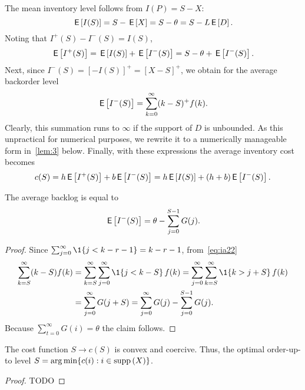 \documentclass[stochastic-or.tex]{subfiles}
\begin{document}
The mean inventory level follows from $I(P) = S - X$:
\begin{equation*}
\,\mathsf{E}\left[I(S)\right] = S - \,\mathsf{E}\left[X\right] = S - \theta = S - L\,\mathsf{E}\left[D\right].
\end{equation*}
Noting that $I^+(S) - I^-(S) = I(S)$,
\begin{equation*}
\,\mathsf{E}\left[I^+(S)\right] = \,\mathsf{E}\left[I(S)\right] + \,\mathsf{E}\left[I^-(S)\right] = S - \theta + \,\mathsf{E}\left[I^-(S)\right].
\end{equation*}
Next, since $I^{-}(S) = [-I(S)]^{+} = [X-S]^{+}$,  we obtain for the average backorder level
\begin{equation}\label{eq:ia22}
\,\mathsf{E}\left[I^-(S)\right] =\sum_{k=0}^\infty (k- S)^+f(k).
\end{equation}
Clearly, this summation runs to $\infty$ if the support of $D$ is unbounded.
As this unpractical for numerical purposes, we rewrite it to a numerically manageable form in~\cref{lem:3} below.
Finally, with these expressions the average inventory cost becomes
\begin{equation*}
c(S) =  h \,\mathsf{E}\left[I^{+}(S)\right] +  b \,\mathsf{E}\left[I^-(S)\right] = h \,\mathsf{E}\left[I(S)\right] +  (h+b) \,\mathsf{E}\left[I^-(S)\right].
\end{equation*}



\begin{lemma}
\label{lem:3}
The average backlog is equal to
\begin{equation*}
   \,\mathsf{E}\left[I^-(S)\right] = \theta - \sum_{j=0}^{S-1} G(j).
\end{equation*}
\end{lemma}
\begin{proof} Since $\sum_{j=0}^\infty \1{j< k-r - 1} = k-r -1$, from~\cref{eq:ia22}
\begin{align*}
   \sum_{k=S}^\infty (k-S) f(k)
   &= \sum_{k=S}^\infty\sum_{j=0}^\infty \1{j < k-S}\, f(k)   =
    \sum_{j=0}^\infty \sum_{k=S}^\infty \1{k > j +S}\, f(k)\\
   &= \sum_{j=0}^\infty  G(j+S)
   = \sum_{j=0}^\infty  G(j) - \sum_{j=0}^{S-1} G(j).
\end{align*}
Because $\sum_{t=0}^\infty G(i) = \theta$ the claim follows.
\end{proof}

\begin{theorem}
The cost function $S\to c(S)$ is convex and coercive. Thus, the optimal order-up-to level $S = \operatorname*{arg\,min}\{c(i) : i \in \mathrm{supp}\left(X\right)\}$.
\end{theorem}
\begin{proof}
TODO
\end{proof}
\end{document}
